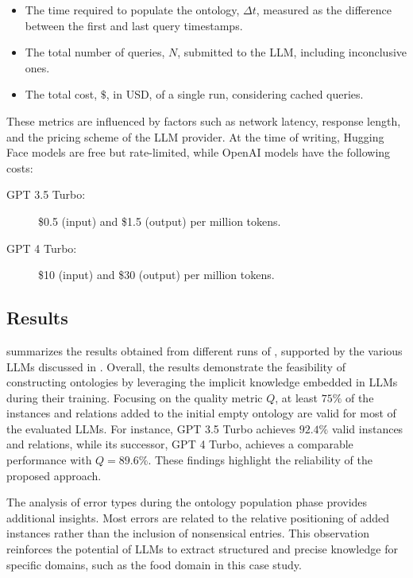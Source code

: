 %
\begin{itemize}
    \item The time required to populate the ontology, \(\Delta t\), measured as the difference between the first and last query timestamps.
    \item The total number of queries, \(N\), submitted to the \gls{LLM}, including inconclusive ones.
    \item The total cost, \(\$\), in USD, of a single \llmfkg{} run, considering cached queries.
\end{itemize}

%
These metrics are influenced by factors such as network latency, response length, and the pricing scheme of the \gls{LLM} provider.
%
At the time of writing, Hugging Face models are free but rate-limited, while OpenAI models have the following costs:
%
\begin{description}
    \item[GPT 3.5 Turbo:] \$0.5 (input) and \$1.5 (output) per million tokens.
    \item[GPT 4 Turbo:] \$10 (input) and \$30 (output) per million tokens.
\end{description}
%


\subsection{Results}
\label{ssec:results}
%

%
 summarizes the results obtained from different runs of \llmfkg{}, supported by the various \glspl{LLM} discussed in .
%
Overall, the results demonstrate the feasibility of constructing ontologies by leveraging the implicit knowledge embedded in \glspl{LLM} during their training.
%
Focusing on the quality metric \(Q\), at least \(75\%\) of the instances and relations added to the initial empty ontology are valid for most of the evaluated \glspl{LLM}.
%
For instance, GPT 3.5 Turbo achieves \(92.4\%\) valid instances and relations, while its successor, GPT 4 Turbo, achieves a comparable performance with \(Q = 89.6\%\).
%
These findings highlight the reliability of the proposed approach.

The analysis of error types during the ontology population phase provides additional insights.
%
Most errors are related to the relative positioning of added instances rather than the inclusion of nonsensical entries.
%
This observation reinforces the potential of \glspl{LLM} to extract structured and precise knowledge for specific domains, such as the food domain in this case study.

